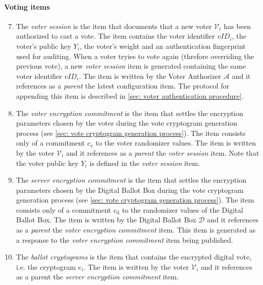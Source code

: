 \paragraph{Voting items}
\begin{enumerate}
    \setcounter{enumi}{6}
    \item The \textit{voter session} is the item that documents that a new voter $\mathcal{V}_i$ has been authorized to cast a vote. The item contains the voter identifier $vID_i$, the voter's public key $Y_i$, the voter's weight and an authentication fingerprint used for auditing. When a voter tryies to vote again (threfore overriding the previous vote), a new \textit{voter session} item is generated containing the same voter identifier $vID_i$. The item is written by the Voter Authorizer $\mathcal{A}$ and it references as a \textit{parent} the latest configuration item. The protocol for appending this item is described in \cref{sec: voter authentication procedure}.

    \item The \textit{voter encryption commitment} is the item that settles the encryption parameters chosen by the voter during the vote cryptogram generation process (see \cref{sec: vote cryptogram generation process}). The item consists only of a commitment $c_\mathrm{v}$ to the voter randomizer values. The item is written by the voter $\mathcal{V}_i$ and it references as a \textit{parent} the \textit{voter session} item. Note that the voter public key $Y_i$ is defined in the \textit{voter session} item.
    
    \item The \textit{server encryption commitment} is the item that settles the encryption parameters chosen by the Digital Ballot Box during the vote cryptogram generation process (see \cref{sec: vote cryptogram generation process}). The item consists only of a commitment $c_\mathrm{d}$ to the randomizer values of the Digital Ballot Box. The item is written by the Digital Ballot Box $\mathcal{D}$ and it references as a \textit{parent} the \textit{voter encryption commitment} item. This item is generated as a response to the \textit{voter encryption commitment} item being published.
    
    \item The \textit{ballot cryptograms} is the item that contains the encrypted digital vote, i.e. the cryptogram $e_i$.  The item  is written by the voter $\mathcal{V}_i$ and it references as a parent the \textit{server encryption commitment} item.
    

\end{enumerate}
